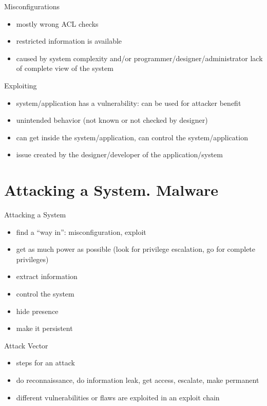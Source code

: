 \documentclass{curs}
\begin{document}
\begin{frame}{Misconfigurations}
  \begin{itemize}
    \pause \item mostly wrong ACL checks
    \pause \item restricted information is available
    \pause \item caused by system complexity and/or programmer/designer/administrator lack of complete view of the system
  \end{itemize}
\end{frame}

\begin{frame}{Exploiting}
  \begin{itemize}
    \pause \item system/application has a vulnerability: can be used for attacker benefit
    \pause \item unintended behavior (not known or not checked by designer)
    \pause \item can get inside the system/application, can control the system/application
    \pause \item issue created by the designer/developer of the application/system
  \end{itemize}
\end{frame}

\section{Attacking a System. Malware}

\begin{frame}{Attacking a System}
  \begin{itemize}
    \pause \item find a ``way in'': misconfiguration, exploit
    \pause \item get as much power as possible (look for privilege escalation, go for complete privileges)
    \pause \item extract information
    \pause \item control the system
    \pause \item hide presence
    \pause \item make it persistent
  \end{itemize}
\end{frame}

\begin{frame}{Attack Vector}
  \begin{itemize}
    \pause \item steps for an attack
    \pause \item do reconnaissance, do information leak, get access, escalate, make permanent
    \pause \item different vulnerabilities or flaws are exploited in an exploit chain
  \end{itemize}
\end{frame}
\end{document}

